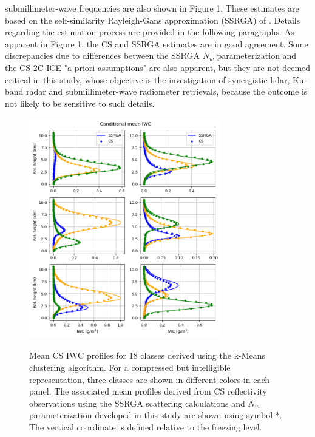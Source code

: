 \documentclass{ametsocV6.1}
\begin{document}
submillimeter-wave frequencies are also shown in Figure 1. These estimates are based on the self-similarity 
Rayleigh-Gans approximation (SSRGA) of \cite{hogan2017ssrga}. Details regarding the
estimation process are provided in the following paragraphs.  As apparent in Figure 1, the CS and SSRGA estimates are in good 
agreement.  Some discrepancies due to differences between the SSRGA $N_w$ parameterization and the CS 2C-ICE 
"a priori assumptions" are also apparent, but they are not deemed critical in this study, whose objective is 
the investigation of synergistic lidar, Ku-band radar and submillimeter-wave radiometer retrievals, because the 
outcome is not likely to be sensitive to such details.
\begin{figure}[t]
    \centering
    \includegraphics[width=0.75\textwidth,angle=0]{./Figs/fig01.png}\\
    \caption{Mean CS IWC profiles for 18 classes derived using the k-Means clustering algorithm. For a 
    compressed but intelligible representation, three classes are shown in different colors in each panel.
    The associated 
    mean profiles derived from CS reflectivity observations using the SSRGA scattering calculations 
    and $N_w$ parameterization developed in this study are shown using symbol *. The vertical coordinate 
    is defined relative to the freezing level.}\label{f1}
\end{figure}
\end{document}
